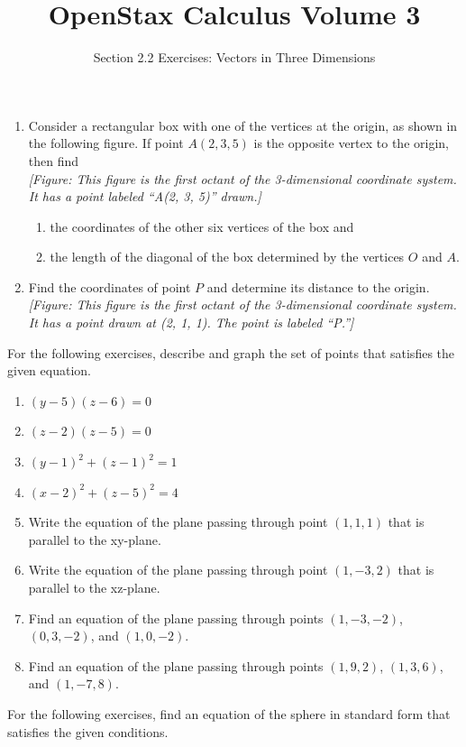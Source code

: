 \documentclass{exercises}
\title{OpenStax Calculus Volume 3}
\subtitle{Section 2.2 Exercises: Vectors in Three Dimensions}
\author{}
\date{}
\begin{document}
\maketitle

\begin{enumerate}[start=1]
\item Consider a rectangular box with one of the vertices at the origin, as shown in the following figure. If point $A(2,3,5)$ is the opposite vertex to the origin, then find \\ \textit{[Figure: This figure is the first octant of the 3-dimensional coordinate system. It has a point labeled ``A(2, 3, 5)'' drawn.]}
\begin{enumerate}[label=(\alph*)]
  \item the coordinates of the other six vertices of the box and
  \item the length of the diagonal of the box determined by the vertices $O$ and $A$.
\end{enumerate}
\item Find the coordinates of point $P$ and determine its distance to the origin. \\ \textit{[Figure: This figure is the first octant of the 3-dimensional coordinate system. It has a point drawn at (2, 1, 1). The point is labeled ``P.'']}
\end{enumerate}

For the following exercises, describe and graph the set of points that satisfies the given equation.

\begin{enumerate}[resume]
\item $(y-5)(z-6)=0$
\item $(z-2)(z-5)=0$
\item ${(y-1)}^{2}+{(z-1)}^{2}=1$
\item ${(x-2)}^{2}+{(z-5)}^{2}=4$
\item Write the equation of the plane passing through point $(1,1,1)$ that is parallel to the xy-plane.
\item Write the equation of the plane passing through point $(1,-3,2)$ that is parallel to the xz-plane.
\item Find an equation of the plane passing through points $(1,-3,-2)$, $(0,3,-2)$, and $(1,0,-2)$.
\item Find an equation of the plane passing through points $(1,9,2)$, $(1,3,6)$, and $(1,-7,8)$.
\end{enumerate}

For the following exercises, find an equation of the sphere in standard form that satisfies the given conditions.
\end{document}
